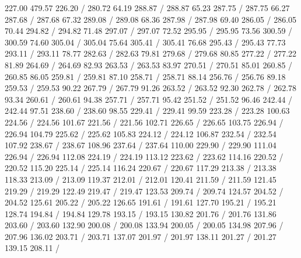 { 227.00 479.57 226.20 /
\setsolid
{} 280.72 64.19 288.87 /
 288.87 65.23 287.75 /
 287.75 66.27 287.68 /
 287.68 67.32 289.08 /
 289.08 68.36 287.98 /
 287.98 69.40 286.05 /
 286.05 70.44 294.82 /
 294.82 71.48 297.07 /
 297.07 72.52 295.95 /
 295.95 73.56 300.59 /
 300.59 74.60 305.04 /
 305.04 75.64 305.41 /
 305.41 76.68 295.43 /
 295.43 77.73 293.11 /
 293.11 78.77 282.63 /
 282.63 79.81 279.68 /
 279.68 80.85 277.22 /
 277.22 81.89 264.69 /
 264.69 82.93 263.53 /
 263.53 83.97 270.51 /
 270.51 85.01 260.85 /
 260.85 86.05 259.81 /
 259.81 87.10 258.71 /
 258.71 88.14 256.76 /
 256.76 89.18 259.53 /
 259.53 90.22 267.79 /
 267.79 91.26 263.52 /
 263.52 92.30 262.78 /
 262.78 93.34 260.61 /
 260.61 94.38 257.71 /
 257.71 95.42 251.52 /
 251.52 96.46 242.44 /
 242.44 97.51 238.60 /
 238.60 98.55 229.41 /
 229.41 99.59 223.28 /
 223.28 100.63 224.56 /
 224.56 101.67 221.56 /
 221.56 102.71 226.65 /
 226.65 103.75 226.94 /
 226.94 104.79 225.62 /
 225.62 105.83 224.12 /
 224.12 106.87 232.54 /
 232.54 107.92 238.67 /
 238.67 108.96 237.64 /
 237.64 110.00 229.90 /
 229.90 111.04 226.94 /
 226.94 112.08 224.19 /
 224.19 113.12 223.62 /
 223.62 114.16 220.52 /
 220.52 115.20 225.14 /
 225.14 116.24 220.67 /
 220.67 117.29 213.38 /
 213.38 118.33 213.09 /
 213.09 119.37 212.01 /
 212.01 120.41 211.59 /
 211.59 121.45 219.29 /
 219.29 122.49 219.47 /
 219.47 123.53 209.74 /
 209.74 124.57 204.52 /
 204.52 125.61 205.22 /
 205.22 126.65 191.61 /
 191.61 127.70 195.21 /
 195.21 128.74 194.84 /
 194.84 129.78 193.15 /
 193.15 130.82 201.76 /
 201.76 131.86 203.60 /
 203.60 132.90 200.08 /
 200.08 133.94 200.05 /
 200.05 134.98 207.96 /
 207.96 136.02 203.71 /
 203.71 137.07 201.97 /
 201.97 138.11 201.27 /
 201.27 139.15 208.11 /
}

